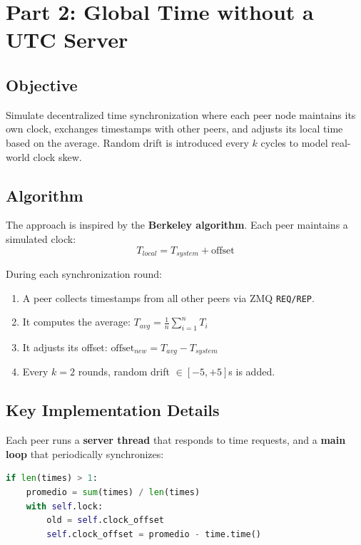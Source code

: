 \documentclass[12pt,a4paper]{article}
\begin{document}
\section{Part 2: Global Time without a UTC Server}

\subsection{Objective}

Simulate decentralized time synchronization where each peer node maintains its own clock, exchanges timestamps with other peers, and adjusts its local time based on the average. Random drift is introduced every $k$ cycles to model real-world clock skew.

\subsection{Algorithm}

The approach is inspired by the \textbf{Berkeley algorithm}. Each peer maintains a simulated clock:
\[T_{local} = T_{system} + \text{offset}\]

During each synchronization round:
\begin{enumerate}
    \item A peer collects timestamps from all other peers via ZMQ \texttt{REQ/REP}.
    \item It computes the average: $T_{avg} = \frac{1}{n} \sum_{i=1}^{n} T_i$
    \item It adjusts its offset: $\text{offset}_{new} = T_{avg} - T_{system}$
    \item Every $k = 2$ rounds, random drift $\in [-5, +5]$s is added.
\end{enumerate}

\subsection{Key Implementation Details}

Each peer runs a \textbf{server thread} that responds to time requests, and a \textbf{main loop} that periodically synchronizes:

\begin{lstlisting}[language=Python, caption={Clock adjustment after collecting peer times}]
if len(times) > 1:
    promedio = sum(times) / len(times)
    with self.lock:
        old = self.clock_offset
        self.clock_offset = promedio - time.time()
\end{lstlisting}
\end{document}
